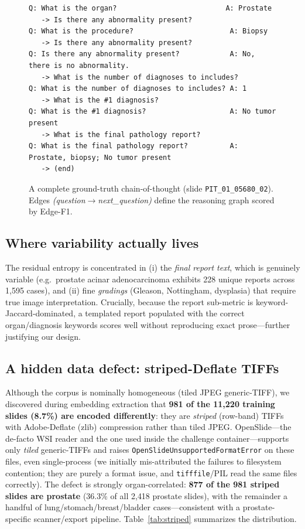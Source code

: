 \documentclass[11pt,a4paper]{article}
\newcommand{\code}[1]{\texttt{\small #1}}
\begin{document}
\begin{figure}[h]
\begin{footnotesize}
\begin{verbatim}
Q: What is the organ?                          A: Prostate
   -> Is there any abnormality present?
Q: What is the procedure?                       A: Biopsy
   -> Is there any abnormality present?
Q: Is there any abnormality present?            A: No, there is no abnormality.
   -> What is the number of diagnoses to includes?
Q: What is the number of diagnoses to includes? A: 1
   -> What is the #1 diagnosis?
Q: What is the #1 diagnosis?                    A: No tumor present
   -> What is the final pathology report?
Q: What is the final pathology report?          A: Prostate, biopsy; No tumor present
   -> (end)
\end{verbatim}
\end{footnotesize}
\caption{A complete ground-truth chain-of-thought (slide \code{PIT\_01\_05680\_02}). Edges
\emph{(question$\rightarrow$next\_question)} define the reasoning graph scored by Edge-F1.}
\label{lst:cot}
\end{figure}

\subsection{Where variability actually lives}
The residual entropy is concentrated in (i) the \emph{final report text}, which is genuinely
variable (e.g.\ prostate acinar adenocarcinoma exhibits 228 unique reports across 1{,}595
cases), and (ii) fine \emph{gradings} (Gleason, Nottingham, dysplasia) that require true image
interpretation. Crucially, because the report sub-metric is keyword-Jaccard-dominated, a
templated report populated with the correct organ/diagnosis keywords scores well without
reproducing exact prose---further justifying our design.

\subsection{A hidden data defect: striped-Deflate TIFFs}
\label{sec:striped}
Although the corpus is nominally homogeneous (tiled JPEG generic-TIFF), we discovered during
embedding extraction that \textbf{981 of the 11{,}220 training slides (8.7\%) are encoded
differently}: they are \emph{striped} (row-band) TIFFs with Adobe-Deflate (zlib) compression
rather than tiled JPEG. OpenSlide---the de-facto WSI reader and the one used inside the challenge
container---supports only \emph{tiled} generic-TIFFs and raises
\code{OpenSlideUnsupportedFormatError} on these files, even single-process (we initially
mis-attributed the failures to filesystem contention; they are purely a format issue, and
\code{tifffile}/PIL read the same files correctly). The defect is strongly organ-correlated:
\textbf{877 of the 981 striped slides are prostate} (36.3\% of all 2{,}418 prostate slides),
with the remainder a handful of lung/stomach/breast/bladder cases---consistent with a
prostate-specific scanner/export pipeline. Table~\ref{tab:striped} summarizes the distribution.
\end{document}
